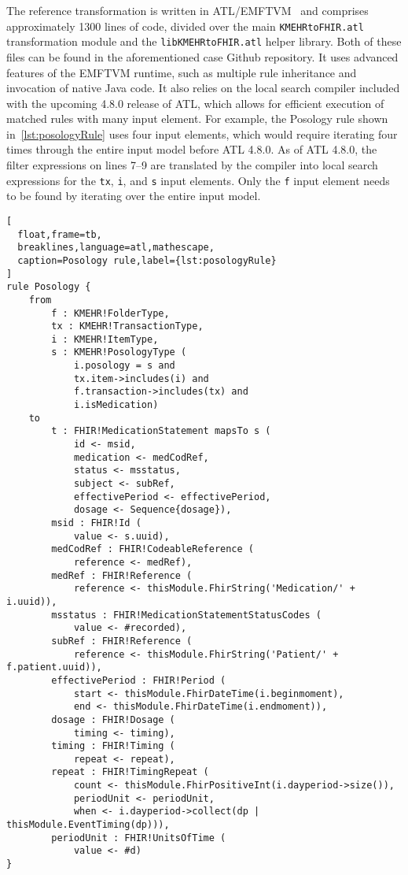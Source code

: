 \documentclass[
twocolumn,
]{ceurart}
\begin{document}
The reference transformation is written in ATL/EMFTVM~\cite{conf/models/Wagelaar2011}
and comprises approximately 1300 lines of code, divided over the main \texttt{KMEHRtoFHIR.atl}
transformation module and the \texttt{libKMEHRtoFHIR.atl} helper library. Both
of these files can be found in the aforementioned case Github repository. It uses
advanced features of the EMFTVM runtime, such as multiple rule inheritance and
invocation of native Java code. It also relies on the local search compiler
included with the upcoming 4.8.0 release of ATL, which allows for efficient
execution of matched rules with many input element. For example, the Posology
rule shown in~\ref{lst:posologyRule} uses four input elements, which would
require iterating four times through the entire input model before ATL 4.8.0.
As of ATL 4.8.0, the filter expressions on lines 7--9 are translated by the compiler
into local search expressions for the \texttt{tx}, \texttt{i}, and \texttt{s} input
elements. Only the \texttt{f} input element needs to be found by iterating over
the entire input model.

\begin{lstlisting}[
  float,frame=tb,
  breaklines,language=atl,mathescape,
  caption=Posology rule,label={lst:posologyRule}
]
rule Posology {
	from
		f : KMEHR!FolderType,
		tx : KMEHR!TransactionType,
		i : KMEHR!ItemType,
		s : KMEHR!PosologyType (
			i.posology = s and
			tx.item->includes(i) and
			f.transaction->includes(tx) and
			i.isMedication)
	to
		t : FHIR!MedicationStatement mapsTo s (
			id <- msid,
			medication <- medCodRef,
			status <- msstatus,
			subject <- subRef,
			effectivePeriod <- effectivePeriod,
			dosage <- Sequence{dosage}),
		msid : FHIR!Id (
			value <- s.uuid),
		medCodRef : FHIR!CodeableReference (
			reference <- medRef),
		medRef : FHIR!Reference (
			reference <- thisModule.FhirString('Medication/' + i.uuid)),
		msstatus : FHIR!MedicationStatementStatusCodes (
			value <- #recorded),
		subRef : FHIR!Reference (
			reference <- thisModule.FhirString('Patient/' + f.patient.uuid)),
		effectivePeriod : FHIR!Period (
			start <- thisModule.FhirDateTime(i.beginmoment),
			end <- thisModule.FhirDateTime(i.endmoment)),
		dosage : FHIR!Dosage (
			timing <- timing),
		timing : FHIR!Timing (
			repeat <- repeat),
		repeat : FHIR!TimingRepeat (
			count <- thisModule.FhirPositiveInt(i.dayperiod->size()),
			periodUnit <- periodUnit,
			when <- i.dayperiod->collect(dp | thisModule.EventTiming(dp))),
		periodUnit : FHIR!UnitsOfTime (
			value <- #d)
}
\end{lstlisting}
\end{document}
